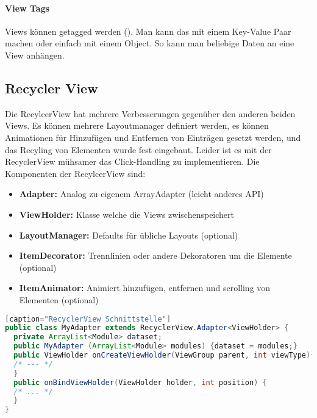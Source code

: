 \paragraph{View Tags} Views können getagged werden (). Man kann das mit einem Key-Value Paar machen oder einfach mit einem Object. So kann man beliebige Daten an eine View anhängen. 
\subsection{Recycler View} 
Die RecylcerView hat mehrere Verbesserungen gegenüber den anderen beiden Views. Es können mehrere Layoutmanager definiert werden, es können Animationen für Hinzufügen und Entfernen von Einträgen gesetzt werden, und das Recyling von Elementen wurde fest eingebaut. Leider ist es mit der RecyclerView mühsamer das Click-Handling zu implementieren. Die Komponenten der RecylcerView sind:
\begin{itemize}
\item \textbf{Adapter:} Analog zu eigenem ArrayAdapter (leicht anderes API)
\item \textbf{ViewHolder:} Klasse welche die Views zwischenspeichert
\item \textbf{LayoutManager:} Defaults für übliche Layouts (optional)
\item \textbf{ItemDecorator:} Trennlinien oder andere Dekoratoren um die Elemente (optional)
\item \textbf{ItemAnimator:} Animiert hinzufügen, entfernen und scrolling von Elementen (optional)
\end{itemize}
\begin{lstlisting}[language=java][caption="RecyclerView Schnittstelle"]
public class MyAdapter extends RecyclerView.Adapter<ViewHolder> {
  private ArrayList<Module> dataset;
  public MyAdapter (ArrayList<Module> modules) {dataset = modules;}
  public ViewHolder onCreateViewHolder(ViewGroup parent, int viewType){ 
  /* --- */
  }
  public onBindViewHolder(ViewHolder holder, int position) {
  /* ... */
  }
}
\end{lstlisting}

